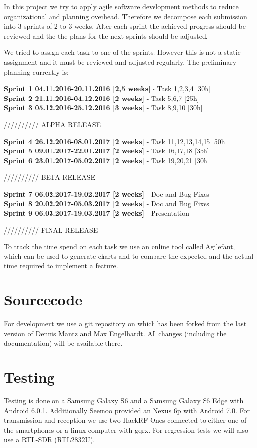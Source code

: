 In this project we try to apply agile software development methods to reduce organizational and planning overhead. Therefore we decompose each submission into 3 sprints of 2 to 3 weeks. After each sprint the achieved progress should be reviewed and the the plans for the next sprints should be adjusted. 

We tried to assign each task to one of the sprints. However this is not a static assignment and it must be reviewed and adjusted regularly. The preliminary planning currently is: 


\noindent\textbf{Sprint 1 04.11.2016-20.11.2016 [2,5 weeks]} 
- Task 1,2,3,4 [30h]\\
\textbf{Sprint 2 21.11.2016-04.12.2016 [2 weeks]}
- Task 5,6,7 [25h]\\
\textbf{Sprint 3 05.12.2016-25.12.2016 [3 weeks]}
- Task 8,9,10 [30h]

////////// ALPHA RELEASE

\noindent\textbf{Sprint 4 26.12.2016-08.01.2017 [2 weeks]}
- Task 11,12,13,14,15 [50h]\\
\textbf{Sprint 5 09.01.2017-22.01.2017 [2 weeks]}
- Task 16,17,18 [35h]\\
\textbf{Sprint 6 23.01.2017-05.02.2017 [2 weeks]}
- Task 19,20,21 [30h]


////////// BETA RELEASE

\noindent\textbf{Sprint 7 06.02.2017-19.02.2017 [2 weeks]}
- Doc and Bug Fixes\\
\textbf{Sprint 8 20.02.2017-05.03.2017 [2 weeks]}
- Doc and Bug Fixes\\
\textbf{Sprint 9 06.03.2017-19.03.2017 [2 weeks]}
- Presentation 

////////// FINAL RELEASE

To track the time spend on each task we use an online tool called Agilefant, which can be used to generate charts and to compare the expected and the actual time required to implement a feature. 

\section{Sourcecode}

For development we use a git repository on \cite{ANSIAN_GitHub} which has been forked from the last version of Dennis Mantz and Max Engelhardt. All changes (including the documentation) will be available there.

\section{Testing}

Testing is done on a Samsung Galaxy S6 and a Samsung Galaxy S6 Edge with Android 6.0.1. 
Additionally Seemoo provided an Nexus 6p with Android 7.0. 
For transmission and reception we use two HackRF Ones connected to either one of the smartphones or a linux computer with gqrx. For regression tests we will also use a RTL-SDR (RTL2832U).